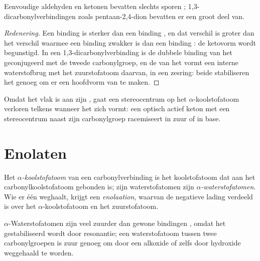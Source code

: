 \begin{proposition}[Enolgehalte]\label{prop:b2:enolates-aldol:enol-content}
Eenvoudige aldehyden en ketonen bevatten slechts sporen ; 1,3-dicarbonylverbindingen zoals
pentaan-2,4-dion bevatten er een groot deel van.
\end{proposition}

\begin{proof}[Redenering]
Een binding  is sterker dan een binding , en dat verschil is groter dan het verschil waarmee een binding  zwakker is dan een binding :
de ketovorm wordt begunstigd. In een 1,3-dicarbonylverbinding is de dubbele binding van het  geconjugeerd
met de tweede carbonylgroep, en de  van het  vormt een interne waterstofbrug met het zuurstofatoom daarvan,
in een zesring: beide stabiliseren het  genoeg om er een hoofdvorm van te maken.
\end{proof}

Omdat het  vlak is aan zijn , gaat een stereocentrum op het $\alpha$-koolstofatoom verloren telkens wanneer
het  zich vormt: een optisch actief keton met een stereocentrum naast zijn carbonylgroep racemiseert in zuur
of in base.

\section{Enolaten}

\begin{definition}[Enolaten]\label{def:b2:enolates-aldol:enolate}
Het \emph{$\alpha$-koolstofatoom} van een carbonylverbinding is het koolstofatoom
dat aan het carbonylkoolstofatoom gebonden is; zijn waterstofatomen zijn \emph{$\alpha$-waterstofatomen}.
Wie er één weghaalt, krijgt een \emph{enolaation}, waarvan de
negatieve lading verdeeld is over het $\alpha$-koolstofatoom en het zuurstofatoom.
\end{definition}

\begin{proposition}\label{prop:b2:enolates-aldol:alpha-acidity}
$\alpha$-Waterstofatomen zijn veel zuurder dan gewone bindingen , omdat het  gestabiliseerd wordt
door resonantie; een waterstofatoom tussen twee carbonylgroepen is zuur genoeg om door een alkoxide of
zelfs door hydroxide weggehaald te worden.
\end{proposition}

